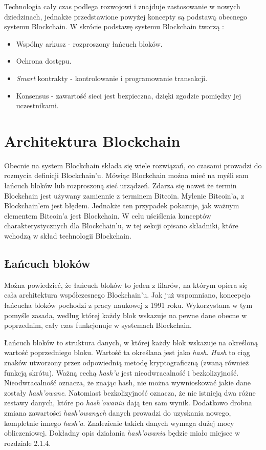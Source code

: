 \documentclass[a4paper,12pt]{book}
\begin{document}
Technologia cały czas podlega rozwojowi i znajduje zastosowanie w nowych dziedzinach, jednakże przedstawione powyżej koncepty są podstawą obecnego systemu Blockchain. W skrócie podstawę systemu Blockchain tworzą \cite{business}:
\begin{itemize}
	\item Wspólny arkusz - rozproszony łańcuch bloków.
	\item Ochrona dostępu.
	\item \textit{Smart} kontrakty - kontrolowanie i programowanie transakcji.
	\item Konsensus - zawartość sieci jest bezpieczna, dzięki zgodzie pomiędzy jej uczestnikami.
\end{itemize}

\section{Architektura Blockchain}

Obecnie na system Blockchain składa się wiele rozwiązań, co czasami prowadzi do rozmycia definicji Blockchain'u. Mówiąc Blockchain można mieć na myśli sam łańcuch bloków lub rozproszoną sieć urządzeń. Zdarza się nawet że termin Blockchain jest używany zamiennie z terminem Bitcoin\cite{bitcoin-vs-blockchain}. Mylenie Bitcoin'a, z Blockchain'em jest błędem. Jednakże ten przypadek pokazuje, jak ważnym elementem Bitcoin'a jest Blockchain. W celu uściślenia konceptów charakterystycznych dla Blockchain'u, w tej sekcji opisano składniki, które wchodzą w skład technologii Blockchain.

\subsection{Łańcuch bloków}

Można powiedzieć, że łańcuch bloków to jeden z filarów, na którym opiera się cała architektura współczesnego Blockchain'u. Jak już wspomniano, koncepcja łańcucha bloków pochodzi z pracy naukowej z 1991 roku. Wykorzystana w tym pomyśle zasada, według której każdy blok wskazuje na pewne dane obecne w poprzednim, cały czas funkcjonuje w systemach Blockchain.

Łańcuch bloków to struktura danych, w której każdy blok wskazuje na określoną wartość poprzedniego bloku. Wartość ta określana jest jako \textit{hash}. \textit{Hash} to ciąg znaków utworzony przez odpowiednią metodę kryptograficzną (zwaną również funkcją skrótu). Ważną cechą \textit{hash'u} jest nieodwracalność i bezkolizyjność. Nieodwracalność oznacza, że znając hash, nie można wywnioskować jakie dane zostały \textit{hash'owane}. Natomiast bezkolizyjność oznacza, że nie istnieją dwa różne zestawy danych, które po \textit{hash'owaniu} dają ten sam wynik. Dodatkowo drobna zmiana zawartości \textit{hash'owanych} danych prowadzi do uzyskania nowego, kompletnie innego \textit{hash'a}. Znalezienie takich danych wymaga dużej mocy obliczeniowej\cite{hash}. Dokładny opis działania \textit{hash'owania} będzie miało miejsce w rozdziale 2.1.4.
\end{document}
